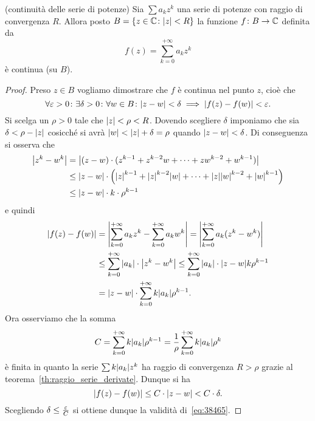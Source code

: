 \begin{theorem}(continuità delle serie di potenze)
\label{th:continuita_somma_serie}%
%
%
Sia $\sum a_k z^k$ una serie di potenze con raggio di convergenza $R$.
Allora posto $B={\left\{ z\in \mathbb C\colon {\left|z\right|}<R \right\}}$ la funzione $f\colon B \to \mathbb C$
definita da
\[
 f(z) = \sum_{k=0}^{+\infty} a_k z^k
\]
è continua (su $B$).
\end{theorem}
%
\begin{proof}
Preso $z\in B$ vogliamo dimostrare che $f$ è continua nel
punto $z$, cioè che
\begin{equation}\label{eq:38465}
 \forall \varepsilon>0\colon \exists \delta>0 \colon
 \forall w\in B\colon
 {\left|z-w\right|}<\delta \implies {\left|f(z)-f(w)\right|}< \varepsilon.
\end{equation}
Si scelga un $\rho>0$ tale che ${\left|z\right|}< \rho < R$.
Dovendo scegliere $\delta$ imponiamo che sia $\delta < \rho-{\left|z\right|}$
cosicché si avrà ${\left|w\right|} < {\left|z\right|} + \delta  = \rho$
quando ${\left|z-w\right|}< \delta$.
Di conseguenza si osserva che
\begin{align*}
 {\left|z^k - w^k\right|}
 &= {\left|(z - w)\cdot(z^{k-1} + z^{k-2}w + \dots + z w^{k-2}+ w^{k-1})\right|} \\
 &\le {\left|z-w\right|}\cdot {\left( {\left|z\right|}^{k-1} + {\left|z\right|}^{k-2}{\left|w\right|} + \dots + {\left|z\right|} {\left|w\right|}^{k-2} + {\left|w\right|}^{k-1} \right)} \\
 &\le {\left|z-w\right|}\cdot k \cdot \rho^{k-1}
\end{align*}
e quindi
\begin{align*}
{\left|f(z) - f(w)\right|}
&= {\left|\sum_{k=0}^{+\infty} a_k z^k - \sum_{k=0}^{+\infty} a_k w^k\right|}
= {\left|\sum_{k=0}^{+\infty} a_k (z^k - w^k)\right|} \\
&\le \sum_{k=0}^{+\infty} {\left|a_k\right|} \cdot {\left|z^k - w^k\right|}
\le \sum_{k=0}^{+\infty} {\left|a_k\right|} \cdot {\left|z - w\right|} k \rho^{k-1}\\
&= {\left|z -w\right|}\cdot \sum_{k=0}^{+\infty} k {\left|a_k\right|} \rho^{k-1}.
\end{align*}
Ora osserviamo che la somma
\[
   C = \sum_{k=0}^{+\infty} k {\left|a_k\right|} \rho^{k-1}
     = \frac{1}{\rho} \sum_{k=0}^{+\infty} k {\left|a_k\right|} \rho^k
\]
è finita in quanto la serie $\sum k{\left|a_k\right|}z^k$ ha raggio di convergenza
$R>\rho$ grazie al teorema~\ref{th:raggio_serie_derivate}.
Dunque si ha
\[
  {\left|f(z)-f(w)\right|} \le C\cdot {\left|z-w\right|} < C\cdot  \delta.
\]
Scegliendo $\delta\le \frac{\varepsilon}{C}$ si ottiene dunque
la validità di~\eqref{eq:38465}.
\end{proof}

